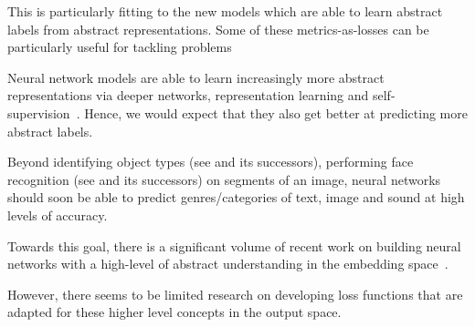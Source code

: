 


This is particularly fitting to the new models which are able to learn abstract labels from abstract representations.
Some of these metrics-as-losses can be particularly useful for tackling problems


Neural network models are able to learn increasingly more abstract representations via deeper networks, representation learning and self-supervision~\citep[see, e.g.,][]{SS,Rep}. Hence, we would expect that they also get better at predicting more abstract labels. 

Beyond identifying object types (see \cite{YOLO} and its successors), performing face recognition (see \cite{FaceNet} and its successors) on segments of an image, neural networks should soon be able to predict genres/categories of text, image and sound at high levels of accuracy. 

Towards this goal, there is a significant volume of recent work on building neural networks with a high-level of abstract understanding in the embedding space~.

However, there seems to be limited research on developing loss functions that are adapted for these higher level concepts in the output space.







